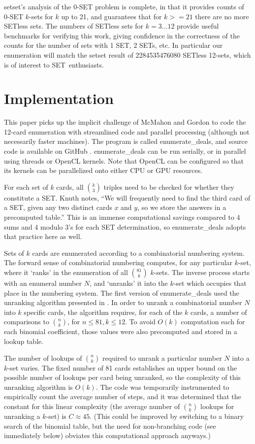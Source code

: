 \documentclass[10pt]{amsart}
\newcommand{\SETb}{SET\texttrademark\ } %
\newcommand{\SETSET}{{\sc setset}}
\newcommand{\SETSETb}{{\sc setset }}
\newcommand{\ED}{{\sc enumerate\_deals}}
\newcommand{\EDb}{{\sc enumerate\_deals }}
\begin{document}
\SETSET's analysis of the 0-SET problem is complete, in that it provides counts
of 0-SET $k$-sets for $k$ up to 21, and \cite{MAXCAP} guarantees that for
$k>=21$ there are no more SETless sets. The numbers of SETless sets for
$k=3\ldots 12$ provide useful benchmarks for verifying this work, giving
confidence in the correctness of the counts for the number of sets with 1 SET, 2
SETs, etc. In particular our enumeration will match the \SETSETb result of
2284535476080 SETless 12-sets, which is of interest to \SETb enthusiasts.


\section{Implementation}
This paper picks up the implicit challenge of McMahon and Gordon to code the
12-card enumeration with streamlined code and parallel processing (although not
necessarily faster machines). The program is called \ED, and source code is
available on GitHub \cite{ME}. \EDb can be run serially, or in parallel using
threads or OpenCL \cite{OPENCL} kernels. Note that OpenCL can be configured so
that its kernels can be parallelized onto either CPU or GPU resources.

For each set of $k$ cards, all $\binom{k}{3}$ triples need to be checked for
whether they constitute a SET. Knuth notes, ``We will frequently need to find
the third card of a SET, given any two distinct cards $x$ and $y$, so we store
the answers in a precomputed table.''  This is an immense computational savings
compared to 4 sums and 4 modulo 3's for each SET determination, so \EDb adopts
that practice here as well.

Sets of $k$ cards are enumerated according to a combinatorial numbering
system. The forward sense of combinatorial numbering computes, for any
particular $k$-set, where it `ranks' in the enumeration of all $\binom{81}{k}$
$k$-sets. The inverse process starts with an enumeral number $N$, and `unranks'
it into the $k$-set which occupies that place in the numbering system. The first
version of \EDb used the unranking algorithm presented in \cite{WIKI}. In
order to unrank a combinatorial number $N$ into $k$ specific cards, the
algorithm requires, for each of the $k$ cards, a number of comparisons to
$\binom{n}{k}$, for $n\le 81, k\le 12$. To avoid $O(k)$ computation each for
each binomial coefficient, those values were also precomputed and stored in a
lookup table.

The number of lookups of $\binom{n}{k}$ required to unrank a particular number
$N$ into a $k$-set varies. The fixed number of 81 cards establishes an upper
bound on the possible number of lookups per card being unranked, so the
complexity of this unranking algorithm is $O(k)$. The code was temporarily
instrumented to empirically count the average number of steps, and it was
determined that the constant for this linear complexity (the average number of
$\binom{n}{k}$ lookups for unranking a $k$-set) is $C\approx 45$. (This could be
improved by switching to a binary search of the binomial table, but the need for
non-branching code (see immediately below) obviates this computational approach
anyways.)
\end{document}
